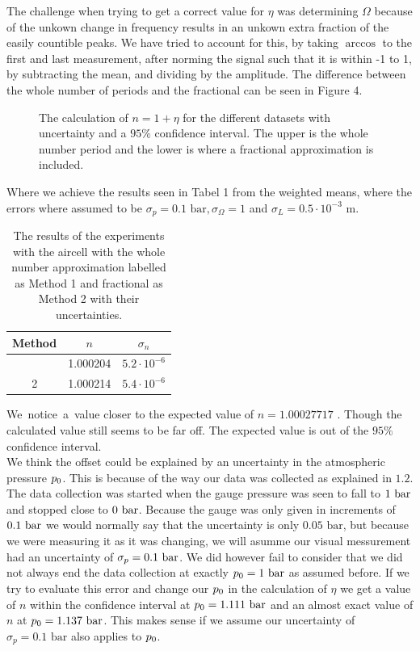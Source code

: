 The challenge when trying to get a correct value for $\eta$ was determining $\Omega$ because of the unkown change in frequency results in an unkown extra fraction of the easily countible peaks.
We have tried to account for this, by taking $\arccos$ to the first and last measurement, after norming the signal such that it is within -1 to 1, by subtracting the mean, and dividing by the amplitude.
The difference between the whole number of periods and the fractional can be seen in Figure 4. 
\begin{figure}
    \centering
    
    \caption{The calculation of $n=1+\eta$ for the different datasets with uncertainty and a $95\%$ confidence interval. The upper is the whole number period and the lower is where a fractional approximation is included.} 
    \label{fig:AircellFig}
\end{figure}
Where we achieve the results seen in Tabel 1 from the weighted means, where the errors where assumed to be $\sigma_p = 0.1 \text{ bar}, \sigma_\Omega = 1$ and $\sigma_L = 0.5 \cdot 10^{-3} \text{ m}$.
\begin{table}[!ht]
    \caption{The results of the experiments with the aircell with the whole number approximation labelled as Method 1 and fractional as Method 2 with their uncertainties.}
    \centering
    \begin{tabular}{c c c}
        \hline\hline
        Method & $n$ & $\sigma_{n}$ \\
        \hline
        \rule{0pt}{1.1em}\noindent
        1 & 1.000204 & $5.2 \cdot 10^{-6}$ \\
        2 & 1.000214 & $5.4 \cdot 10^{-6}$ \\
        \hline
    \end{tabular}
    \label{table:AircellData}
\end{table}
\mbox{We notice a }value closer to the expected value of $n=1.00027717$ \autocite{air}. 
Though the calculated value still seems to be far off. The expected value is out of the $95\%$ confidence interval. \\
We think the offset could be explained by an uncertainty in the atmospheric pressure $p_{\textup{0}}$. 
This is because of the way our data was collected as explained in $1.2$. The data collection was started when the gauge pressure was seen to fall to $1 \textup{ bar}$ and stopped close to $0 \textup{ bar}$.
Because the gauge was only given in increments of $0.1 \textup{ bar}$ we would normally say that the uncertainty is only $0.05 \text{ bar}$, but because we were measuring it as it was changing, we will asumme our visual messurement had an uncertainty of $\sigma_{p} = 0.1 \textup{ bar}$.
We did however fail to consider that we did not always end the data collection at exactly $p_{\textup{0}} = 1 \textup{ bar}$ as assumed before. 
If we try to evaluate this error and change our $p_{\textup{0}}$ in the calculation of $\eta$ we get a value of $n$ within the confidence interval at $p_{\textup{0}} = 1.111 \textup{ bar}$ and an almost exact value of $n$ at $p_{\textup{0}} = 1.137 \textup{ bar}$.
This makes sense if we assume our uncertainty of $\sigma_{p} = 0.1 \text{ bar}$ also applies to $p_{\textup{0}}$.
